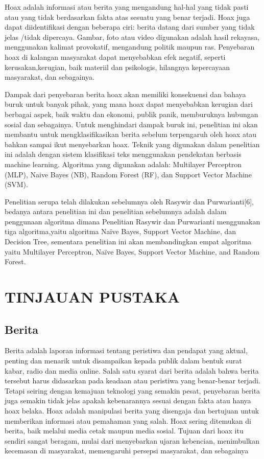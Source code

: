 \documentclass{article}
\begin{document}
Hoax adalah informasi atau berita yang mengandung hal-hal yang tidak pasti atau yang 
tidak berdasarkan fakta atas sesuatu yang benar terjadi. Hoax juga dapat diidentifikasi 
dengan beberapa ciri: berita datang dari sumber yang tidak jelas /tidak dipercaya. 
Gambar, foto atau video digunakan adalah hasil rekayasa, menggunakan kalimat 
provokatif, mengandung politik maupun ras. Penyebaran hoax di kalangan masyarakat 
dapat menyebabkan efek negatif, seperti kerusakan,kerugian, baik materiil dan 
psikologis, hilangnya kepercayaan masyarakat, dan sebagainya. 

Dampak dari penyebaran berita hoax akan memiliki konsekuensi dan bahaya buruk 
untuk banyak pihak, yang mana hoax dapat menyebabkan kerugian dari berbagai 
aspek, baik waktu dan ekonomi, publik panik, memburuknya hubungan sosial dan 
sebagainya. Untuk menghindari dampak buruk ini, penelitian ini akan membantu untuk 
mengklasifikasikan berita sebelum terpengaruh oleh hoax atau bahkan sampai ikut 
menyebarkan hoax. Teknik yang digunakan dalam penelitian ini adalah dengan sistem 
klasifikasi teks menggunakan pendekatan berbasis machine learning. Algoritma yang 
digunakan adalah: Multilayer Perceptron (MLP), Naive Bayes (NB), Random Forest 
(RF), dan Support Vector Machine (SVM).

Penelitian serupa telah dilakukan sebelumnya oleh Rasywir dan Purwarianti[6], 
bedanya antara penelitian ini dan penelitian sebelumnya adalah dalam penggunaan 
algoritma dimana Penelitian Rasywir dan Purwarianti menggunakan tiga 
algoritma,yaitu algoritma Naïve Bayes, Support Vector Machine, dan Decision Tree, 
sementara penelitian ini akan membandingkan empat algoritma yaitu Multilayer 
Perceptron, Naïve Bayes, Support Vector Machine, and Random Forest.

\section{TINJAUAN PUSTAKA}
\subsection{Berita}Berita adalah laporan informasi tentang peristiwa dan pendapat yang aktual, penting 
dan menarik untuk disampaikan kepada publik dalam bentuk surat kabar, radio dan 
media online. Salah satu syarat dari berita adalah bahwa berita tersebut harus 
didasarkan pada keadaan atau peristiwa yang benar-benar terjadi. Tetapi seiring dengan 
kemajuan teknologi yang semakin pesat, penyebaran berita juga semakin tidak jelas 
apakah kebenarannya sesuai dengan fakta atau hanya hoax belaka. Hoax adalah 
manipulasi berita yang disengaja dan bertujuan untuk memberikan informasi atau 
pemahaman yang salah. Hoax sering ditemukan di berita, baik melalui media cetak 
maupun media sosial. Tujuan dari hoax itu sendiri sangat beragam, mulai dari 
menyebarkan ujaran kebencian, menimbulkan kecemasan di masyarakat, memengaruhi 
persepsi masyarakat, dan sebagainya
\end{document}
